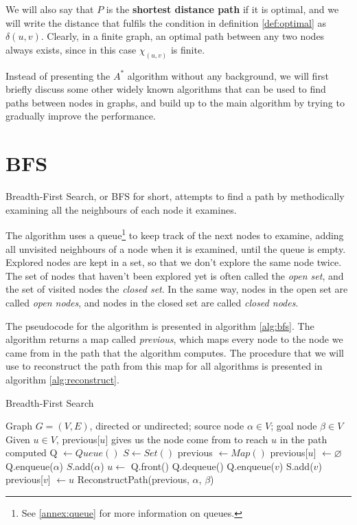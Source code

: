 \documentclass[a4paper,10pt]{report}
\begin{document}
We will also say that $P$ is the \textbf{shortest distance path} if it is optimal, and we will write the distance that fulfils the condition in definition \ref{def:optimal} as $\delta(u,v)$. Clearly, in a finite graph, an optimal path between any two nodes always exists, since in this case $\chi_{(u, v)}$ is finite.

Instead of presenting the $A^*$ algorithm without any background, we will first briefly discuss some other widely known algorithms that can be used to find paths between nodes in graphs, and build up to the main algorithm by trying to gradually improve the performance.

\section{BFS}
Breadth-First Search, or BFS for short, attempts to find a path by methodically examining all the neighbours of each node it examines.

The algorithm uses a queue\footnote{See \ref{annex:queue} for more information on queues.} to keep track of the next nodes to examine, adding all unvisited neighbours of a node when it is examined, until the queue is empty. Explored nodes are kept in a set, so that we don't explore the same node twice. The set of nodes that haven't been explored yet is often called the \emph{open set}, and the set of visited nodes the \emph{closed set}. In the same way, nodes in the open set are called \emph{open nodes}, and nodes in the closed set are called \emph{closed nodes}.

The pseudocode for the algorithm is presented in algorithm \ref{alg:bfs}. The algorithm returns a map called \emph{previous}, which maps every node to the node we came from in the path that the algorithm computes. The procedure that we will use to reconstruct the path from this map for all algorithms is presented in algorithm \ref{alg:reconstruct}.

\begin{algorithm}
\caption{Breadth-First Search}
\label{alg:bfs}
\begin{algorithmic}[1]
\Require Graph $G = (V, E)$, directed or undirected; source node $\alpha \in V$; goal node $\beta \in V$
\Ensure Given $u \in V$, previous[$u$] gives us the node come from to reach $u$ in the path computed
\State Q $\gets Queue()$
\State $S \gets Set()$ 
\State previous $\gets Map()$
	\State previous[$u$] $\gets \varnothing$
\EndFor
\State Q.enqueue($\alpha$)
\State $S$.add($\alpha$)
	\State $u \gets$ Q.front()
	\State Q.dequeue()
			\State Q.enqueue($v$)
			\State S.add($v$)
			\State previous[$v$] $\gets u$
		\EndIf
	\EndFor
\EndWhile
\State \Return ReconstructPath(previous, $\alpha$, $\beta$)
\EndProcedure
\end{algorithmic}
\end{algorithm}
\end{document}

